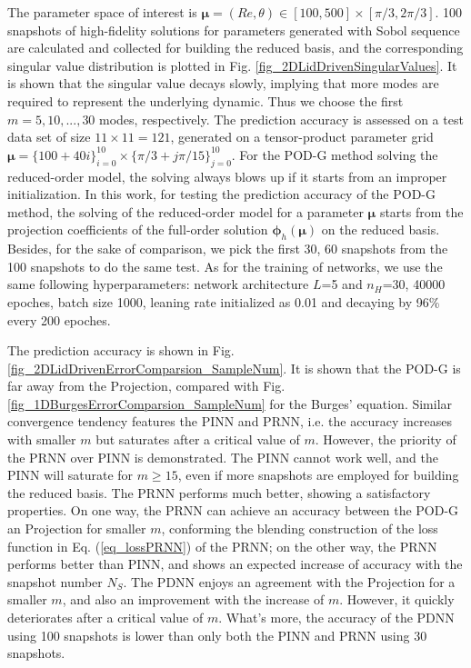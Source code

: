 \documentclass[preprint, 10pt]{elsarticle}
\begin{document}
The parameter space of interest is $\pmb{\mu}=(Re, \theta) \in [100,500] \times [\pi/3, 2\pi/3]$. 100 snapshots of high-fidelity solutions for parameters generated with Sobol sequence are calculated and collected for building the reduced basis, and the corresponding singular value distribution is plotted in Fig. \ref{fig_2DLidDrivenSingularValues}. It is shown that the singular value decays slowly, implying that more modes are required to represent the underlying dynamic. Thus we choose the first $m=5, 10,...,30$ modes, respectively.
The prediction accuracy is assessed on a test data set of size $11 \times 11=121$, generated on a tensor-product parameter grid $\pmb{\mu}=\{100+ 40i\}_{i=0}^{10} \times \{\pi/3+ j\pi/15\}_{j=0}^{10}$.
For the POD-G method solving the reduced-order model, the solving always blows up if it starts from an improper initialization. In this work, for testing the prediction accuracy of the POD-G method, the solving of the reduced-order model for a parameter $\pmb{\mu}$ starts from the projection coefficients of the full-order solution $\pmb{\phi}_h \left( \pmb{\mu} \right)$ on the reduced basis.
Besides, for the sake of comparison, we pick the first 30, 60 snapshots from the 100 snapshots to do the same test. As for the training of networks, we use the same following hyperparameters: network architecture $L$=5 and $n_H$=30, 40000 epoches, batch size 1000, leaning rate initialized as 0.01 and decaying by 96\% every 200 epoches.

The prediction accuracy is shown in Fig. \ref{fig_2DLidDrivenErrorComparsion_SampleNum}. It is shown that the POD-G is far away from the Projection, compared with Fig. \ref{fig_1DBurgesErrorComparsion_SampleNum} for the Burges' equation. Similar convergence tendency features the PINN and PRNN, i.e. the accuracy increases with  smaller $m$ but saturates after a critical value of $m$. However, the priority of the PRNN over PINN is demonstrated. The PINN cannot work well, and the PINN will saturate for $m \ge 15$, even if more snapshots are employed for building the reduced basis. The PRNN performs much better, showing a satisfactory properties.
On one way, the PRNN can achieve an accuracy between the POD-G an Projection for smaller $m$, conforming the blending construction of the loss function in Eq. (\ref{eq_lossPRNN}) of the PRNN; on the other way, the PRNN performs better than PINN, and shows an  expected increase of accuracy with the snapshot number $N_S$. The PDNN enjoys an agreement with the Projection for a smaller $m$, and also an improvement with the increase of $m$. However, it quickly deteriorates after a critical value of $m$. What's more, the accuracy of the PDNN using 100 snapshots is lower than only both the PINN and PRNN using 30 snapshots.
\end{document}
